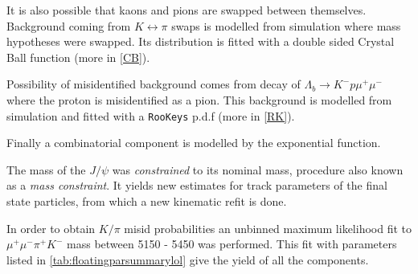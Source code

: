 It is also possible that kaons and pions are swapped between themselves. Background coming from $K \leftrightarrow \pi$ swaps is modelled from simulation where mass hypotheses were swapped. Its distribution is fitted with a double sided Crystal Ball function \cite{Skwarnicki:1986xj} (more in \autoref{CB}).

Possibility of misidentified background comes from decay of $\Lambda_{b} \rightarrow K^{-} p \mu^{+} \mu^{-}$ where the proton is misidentified as a pion. This background is modelled from simulation and fitted with a \texttt{RooKeys} p.d.f (more in \autoref{RK}).

Finally a combinatorial component is modelled by the exponential function.


The mass of the $J/\psi$ was \textit{constrained} to its nominal mass, procedure also known as a \textit{mass constraint}. It yields new estimates for track parameters of the final state particles, from which a new kinematic refit is done.

In order to obtain $K/\pi$ misid probabilities an unbinned maximum likelihood fit to $\mu^{+} \mu^{-} \pi^{+} K^{-}$ mass between 5150 - 5450 \mevcc was performed. This fit with parameters listed in \autoref{tab:floatingparsummarylol} give the yield of all the components. 

